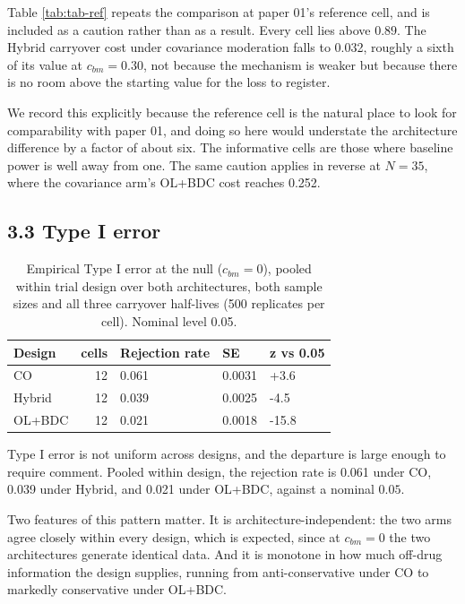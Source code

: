 \documentclass[
  11pt,
]{article}
\begin{document}
Table \ref{tab:tab-ref} repeats the comparison at paper 01's
reference cell, and is included as a caution rather than as a result.
Every cell lies above \(0.89\). The Hybrid carryover cost under
covariance moderation falls to
0.032,
roughly a sixth of its value at \(c_{bm} = 0.30\), not because the
mechanism is weaker but because there is no room above the starting
value for the loss to register.

We record this explicitly because the reference cell is the natural
place to look for comparability with paper 01, and doing so here
would understate the architecture difference by a factor of about
six. The informative cells are those where baseline power is well
away from one. The same caution applies in reverse at \(N = 35\), where
the covariance arm's OL+BDC cost reaches
0.252.

\subsection{3.3 Type I error}

\begin{table}

\caption{\label{tab:tab-type1}Empirical Type I error at the null
    ($c_{bm} = 0$), pooled within trial design over both
    architectures, both sample sizes and all three carryover
    half-lives (500 replicates per cell). Nominal level 0.05.}
\centering
\begin{tabular}[t]{lrlll}
\toprule
Design & cells & Rejection rate & SE & z vs 0.05\\
\midrule
CO & 12 & 0.061 & 0.0031 & +3.6\\
Hybrid & 12 & 0.039 & 0.0025 & -4.5\\
OL+BDC & 12 & 0.021 & 0.0018 & -15.8\\
\bottomrule
\end{tabular}
\end{table}

Type I error is not uniform across designs, and the departure is
large enough to require comment. Pooled within design, the rejection
rate is
0.061
under CO,
0.039
under Hybrid, and
0.021
under OL+BDC, against a nominal \(0.05\).

Two features of this pattern matter. It is architecture-independent:
the two arms agree closely within every design, which is expected,
since at \(c_{bm} = 0\) the two architectures generate identical data.
And it is monotone in how much off-drug information the design
supplies, running from anti-conservative under CO to markedly
conservative under OL+BDC.
\end{document}

